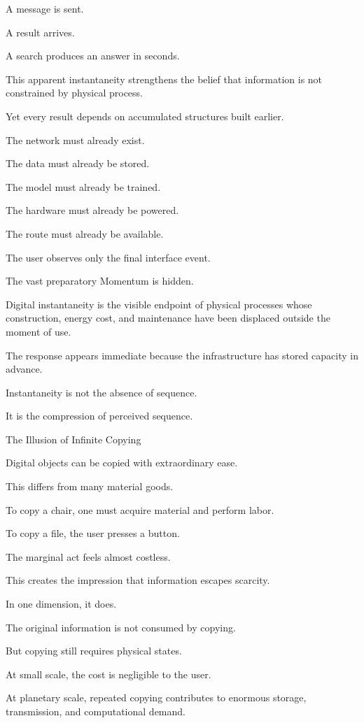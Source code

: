 A message is sent.

A result arrives.

A search produces an answer in seconds.

This apparent instantaneity strengthens the belief that information is not constrained by physical process.

Yet every result depends on accumulated structures built earlier.

The network must already exist.

The data must already be stored.

The model must already be trained.

The hardware must already be powered.

The route must already be available.

The user observes only the final interface event.

The vast preparatory Momentum is hidden.

Digital instantaneity is the visible endpoint of physical processes whose construction, energy cost, and maintenance have been displaced outside the moment of use.

The response appears immediate because the infrastructure has stored capacity in advance.

Instantaneity is not the absence of sequence.

It is the compression of perceived sequence.

The Illusion of Infinite Copying

Digital objects can be copied with extraordinary ease.

This differs from many material goods.

To copy a chair, one must acquire material and perform labor.

To copy a file, the user presses a button.

The marginal act feels almost costless.

This creates the impression that information escapes scarcity.

In one dimension, it does.

The original information is not consumed by copying.

But copying still requires physical states.

At small scale, the cost is negligible to the user.

At planetary scale, repeated copying contributes to enormous storage, transmission, and computational demand.

